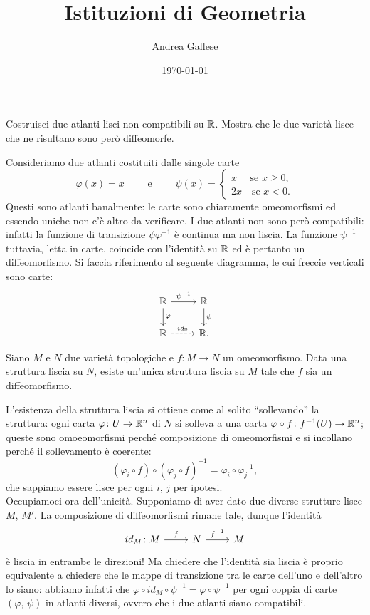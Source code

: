 \documentclass[a4paper]{article}
\title{Istituzioni di Geometria}\let\Title\@title
\author{Andrea Gallese}\let\Author\@author
\date{\today}\let\Date\@date
\begin{document}
	\Intitola

\begin{ex}[1.1]{Costruisci due atlanti lisci non compatibili su $ \mathbb{R} $. Mostra che le due varietà lisce che ne risultano sono però diffeomorfe.}
	
	Consideriamo due atlanti costituiti dalle singole carte $$  \varphi(x) = x \qquad\text{ e }\qquad \psi(x) = \begin{cases}
	x \quad \text{ se } x \geq 0, \\
	2x \quad \text{se } x < 0.
	\end{cases}  $$
	Questi sono atlanti banalmente: le carte sono chiaramente omeomorfismi ed essendo uniche non c'è altro da verificare. I due atlanti non sono però compatibili: infatti la funzione di transizione $ \psi \varphi^{-1} $ è continua ma non liscia. La funzione $ \psi^{-1} $ tuttavia, letta in carte, coincide con l'identità su $ \mathbb{R} $ ed è pertanto un diffeomorfismo. Si faccia riferimento al seguente diagramma, le cui freccie verticali sono carte:
	\[\begin{tikzcd}
	\R \rar["\psi^{-1}"]\dar["\varphi"] & \R \dar["\psi"] \\
	\R \rar[dashed, "id_{\R}"] & \R.
	\end{tikzcd} \]
\end{ex}

\begin{ex}[1.2]{Siano $ M $ e $ N $ due varietà topologiche e $ f \colon M \to N $ un omeomorfismo. Data una struttura liscia su $ N $, esiste un’unica struttura liscia su $ M $ tale che $ f $ sia un diffeomorfismo.}
	
	L'esistenza della struttura liscia si ottiene come al solito {\textquotedblleft sollevando\textquotedblright} la struttura: ogni carta $ \varphi\colon U \to \mathbb{R}^n $ di $ N $ si solleva a una carta $ \varphi \circ f \colon f^{-1}(U) \to \mathbb{R}^n $; queste sono omoeomorfismi perché composizione di omeomorfismi e si incollano perché il sollevamento è coerente: $$  (\varphi_i \circ f) \circ (\varphi_j \circ f)^{-1} = \varphi_i \circ \varphi_j^{-1}, $$
	che sappiamo essere lisce per ogni $ i, \, j $ per ipotesi. \\
	
	Occupiamoci ora dell'unicità. Supponiamo di aver dato due diverse strutture lisce $ M $, $ M' $. La composizione di diffeomorfismi rimane tale, dunque l'identità
	\[\begin{tikzcd}
	id_M \colon M \rar["f"] & N \rar["f^{-1}"] & M
	\end{tikzcd}  \]
	è liscia in entrambe le direzioni! Ma chiedere che l'identità sia liscia è proprio equivalente a chiedere che le mappe di transizione tra le carte dell'uno e dell'altro lo siano: abbiamo infatti che $ \varphi \circ id_M \circ \psi^{-1} = \varphi\circ\psi^{-1} $ per ogni coppia di carte $ (\varphi, \, \psi) $ in atlanti diversi, ovvero che i due atlanti siano compatibili.
\end{ex}
\end{document}
